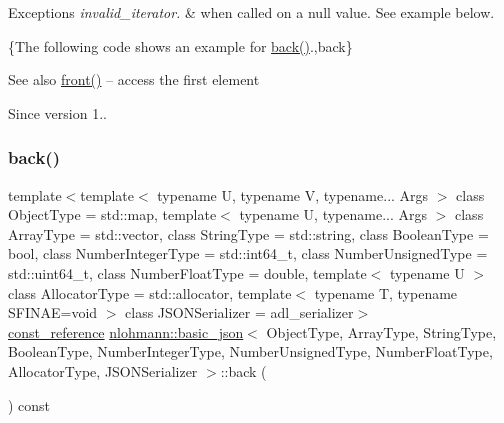 \begin{DoxyExceptions}{Exceptions}
{\em invalid\+\_\+iterator.} & when called on a {\ttfamily null} value. See example below.\\
\hline
\end{DoxyExceptions}
\{The following code shows an example for {\ttfamily \mbox{\hyperlink{classnlohmann_1_1basic__json_a011397134847f36db0ed7d7a93753677}{back()}}}.,back\}

\begin{DoxySeeAlso}{See also}
\mbox{\hyperlink{classnlohmann_1_1basic__json_a3acba9c6ceb7214e565fe08c3ba5b352}{front()}} -- access the first element
\end{DoxySeeAlso}
\begin{DoxySince}{Since}
version 1.. 
\end{DoxySince}
\mbox{\label{classnlohmann_1_1basic__json_a83fe4a151b3a591f357527d5d9aa1b9f}} 
\subsubsection{\texorpdfstring{back()}{back()}\hspace{0.1cm}{\footnotesize\ttfamily [2/2]}}
{\footnotesize\ttfamily template$<$template$<$ typename U, typename V, typename... Args $>$ class Object\+Type = std\+::map, template$<$ typename U, typename... Args $>$ class Array\+Type = std\+::vector, class String\+Type  = std\+::string, class Boolean\+Type  = bool, class Number\+Integer\+Type  = std\+::int64\+\_\+t, class Number\+Unsigned\+Type  = std\+::uint64\+\_\+t, class Number\+Float\+Type  = double, template$<$ typename U $>$ class Allocator\+Type = std\+::allocator, template$<$ typename T, typename S\+F\+I\+N\+A\+E=void $>$ class J\+S\+O\+N\+Serializer = adl\+\_\+serializer$>$ \\
\mbox{\hyperlink{classnlohmann_1_1basic__json_a4057c5425f4faacfe39a8046871786ca}{const\+\_\+reference}} \mbox{\hyperlink{classnlohmann_1_1basic__json}{nlohmann\+::basic\+\_\+json}}$<$ Object\+Type, Array\+Type, String\+Type, Boolean\+Type, Number\+Integer\+Type, Number\+Unsigned\+Type, Number\+Float\+Type, Allocator\+Type, J\+S\+O\+N\+Serializer $>$\+::back (\begin{DoxyParamCaption}{ }\end{DoxyParamCaption}) const\hspace{0.3cm}{\ttfamily [inline]}}



